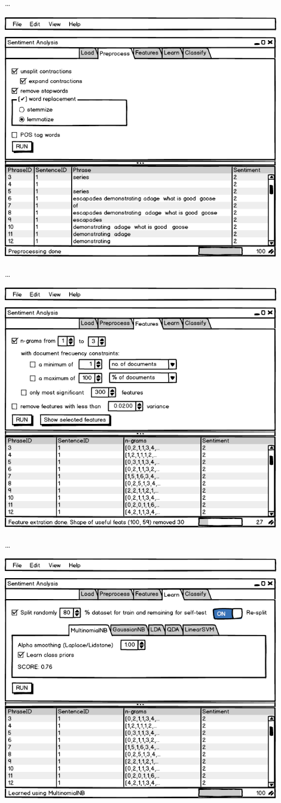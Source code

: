 \ldots

\includegraphics[width=12cm]{gui-2-preprocess}

\ldots

\includegraphics[width=12cm]{gui-3-features}

\ldots

\includegraphics[width=12cm]{gui-4-learn}

